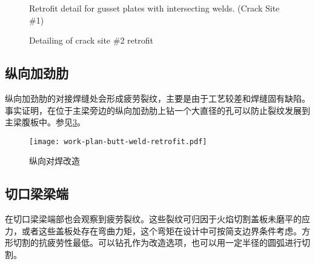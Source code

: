 \begin{figure}
  \caption{Retrofit detail for gusset plates with intersecting welds. (Crack Site \#1)}
  \label{fig:retorfit-detail-gusset-plates}
\end{figure}

\begin{figure}
  \caption{Detailing of crack site \#2 retrofit}
  \label{fig:detailing-crack-site2-retrofit}
\end{figure}

\subsection{纵向加劲肋}
纵向加劲肋的对接焊缝处会形成疲劳裂纹，主要是由于工艺较差和焊缝固有缺陷。事实证明，在位于主梁旁边的纵向加劲肋上钻一个大直径的孔可以防止裂纹发展到主梁腹板中。参见\cref{fig:work-plan-butt-weld-retrofit}。

\begin{figure}
  \texttt{[image: work-plan-butt-weld-retrofit.pdf]}
  \caption{纵向对焊改造}
  \label{fig:work-plan-butt-weld-retrofit}
\end{figure}

\subsection{切口梁梁端}
在切口梁梁端部也会观察到疲劳裂纹。这些裂纹可归因于火焰切割盖板未磨平的应力，或者这些盖板处存在弯曲力矩，这个弯矩在设计中可按简支边界条件考虑。方形切割的抗疲劳性最低。可以钻孔作为改造选项，也可以用一定半径的圆弧进行切割。


